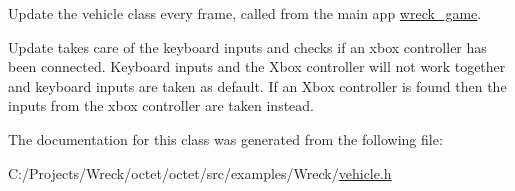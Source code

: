 Update the vehicle class every frame, called from the main app \hyperlink{classoctet_1_1wreck__game}{wreck\+\_\+game}. 

Update takes care of the keyboard inputs and checks if an xbox controller has been connected. Keyboard inputs and the Xbox controller will not work together and keyboard inputs are taken as default. If an Xbox controller is found then the inputs from the xbox controller are taken instead. 

The documentation for this class was generated from the following file\+:\begin{DoxyCompactItemize}
\item 
C\+:/\+Projects/\+Wreck/octet/octet/src/examples/\+Wreck/\hyperlink{vehicle_8h}{vehicle.\+h}\end{DoxyCompactItemize}
